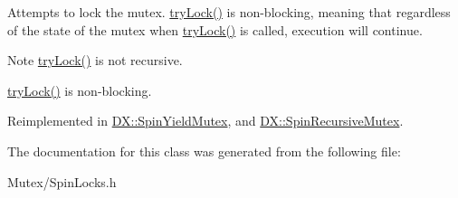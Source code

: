 Attempts to lock the mutex. \hyperlink{class_d_x_1_1_spin_mutex_a395c28ec936bce90ac562039168a540a}{try\-Lock()} is non-\/blocking, meaning that regardless of the state of the mutex when \hyperlink{class_d_x_1_1_spin_mutex_a395c28ec936bce90ac562039168a540a}{try\-Lock()} is called, execution will continue. 

\begin{DoxyNote}{Note}
\hyperlink{class_d_x_1_1_spin_mutex_a395c28ec936bce90ac562039168a540a}{try\-Lock()} is not recursive. 

\hyperlink{class_d_x_1_1_spin_mutex_a395c28ec936bce90ac562039168a540a}{try\-Lock()} is non-\/blocking. 
\end{DoxyNote}


Reimplemented in \hyperlink{class_d_x_1_1_spin_yield_mutex_acd1ed560cf8afd7363a520beff4b5455}{D\-X\-::\-Spin\-Yield\-Mutex}, and \hyperlink{class_d_x_1_1_spin_recursive_mutex_a9150334e2741a1de69f177491214cf15}{D\-X\-::\-Spin\-Recursive\-Mutex}.



The documentation for this class was generated from the following file\-:\begin{DoxyCompactItemize}
\item 
Mutex/Spin\-Locks.\-h\end{DoxyCompactItemize}
